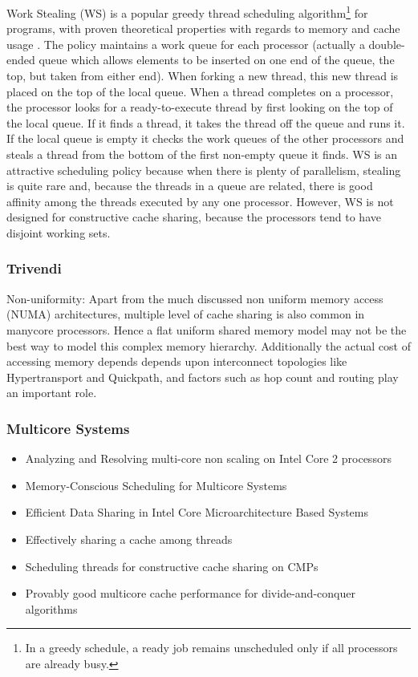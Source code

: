 Work Stealing (WS) is a popular greedy thread scheduling
algorithm\footnote{In a greedy schedule, a ready job remains
  unscheduled only if all processors are already busy.} for programs,
with proven theoretical properties with regards to memory and cache
usage \cite{Blumofe1998, Blumofe1999, Acar2000}. The policy maintains
a work queue for each processor (actually a double-ended queue which
allows elements to be inserted on one end of the queue, the top, but
taken from either end). When forking a new thread, this new thread is
placed on the top of the local queue. When a thread completes on a
processor, the processor looks for a ready-to-execute thread by first
looking on the top of the local queue. If it finds a thread, it takes
the thread off the queue and runs it. If the local queue is empty it
checks the work queues of the other processors and steals a thread
from the bottom of the first non-empty queue it finds. WS is an
attractive scheduling policy because when there is plenty of
parallelism, stealing is quite rare and, because the threads in a
queue are related, there is good affinity among the threads executed
by any one processor. However, WS is not designed for constructive
cache sharing, because the processors tend to have disjoint working
sets.

\subsubsection{Trivendi}

Non-uniformity: Apart from the much discussed non uniform memory
access (NUMA) architectures, multiple level of cache sharing is also
common in manycore processors. Hence a flat uniform shared memory
model may not be the best way to model this complex memory hierarchy.
Additionally the actual cost of accessing memory depends depends upon
interconnect topologies like Hypertransport and Quickpath, and factors
such as hop count and routing play an important role.

\subsubsection{Multicore Systems}

\begin{itemize}
\item[\textbullet] Analyzing and Resolving multi-core non scaling on
  Intel Core 2 processors \cite{Levinthal2007}
\item[\textbullet] Memory-Conscious Scheduling for Multicore Systems
  \cite{Majo2010}
\item[\textbullet] Efficient Data Sharing in Intel
  \textsuperscript{\textregistered} Core Microarchitecture Based
  Systems \cite{Shemer2007}
\item[\textbullet] Effectively sharing a cache among threads
  \cite{Blelloch2004}
\item[\textbullet] Scheduling threads for constructive cache sharing
  on CMPs \cite{Chen2007}
\item[\textbullet] Provably good multicore cache performance for
  divide-and-conquer algorithms \cite{Blelloch2008}
\end{itemize}

